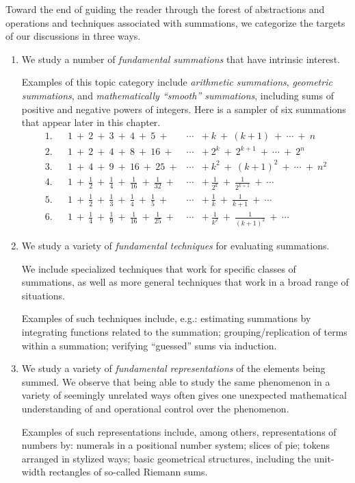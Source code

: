 Toward the end of guiding the reader through the forest of
abstractions and operations and techniques associated with summations,
we categorize the targets of our discussions in three ways.
\begin{enumerate}
\item
We study a number of {\it fundamental summations} that have intrinsic
interest.

\smallskip

Examples of this topic category include {\it arithmetic summations},
{\it geometric summations}, and {\it mathematically ``smooth''
  summations}, including sums of positive and negative powers of
integers.  Here is a sampler of six summations that appear later in this
chapter.
\[
\begin{array}{lclcl}
1.  & &
1 \ + \ 2 \ + \ 3 \ + \ 4 \ + \ 5 \ + & \cdots & + \ k  \ + \ (k+1) \ +
\ \cdots \ + \ n \\
2. & &
1 \ + \ 2 \ + \ 4 \ + \ 8 \ + \ 16 \ + & \cdots & + \ 2^k  \ +
\ 2^{k+1} \ + \ \cdots \ + \ 2^n \\
3. & &
1 \ + \ 4 \ + \ 9 \ + \ 16 \ + \ 25 \ + & \cdots & + \ k^2  \ + \ (k+1)^2 \ +
\ \cdots \ + \ n^2 \\
4. & &
1 \ + \ \frac{1}{2} \ + \ \frac{1}{4} \ + \ \frac{1}{16} \ +
\ \frac{1}{32} \ + & \cdots & + \ \frac{1}{2^k}  \ + \ \frac{1}{2^{k+1}} \ +
\ \cdots \\
5. & &
1 \ + \ \frac{1}{2} \ + \ \frac{1}{3} \ + \ \frac{1}{4} \ +
\ \frac{1}{5} \ + & \cdots & + \ \frac{1}{k}  \ + \ \frac{1}{k+1} \ +
\ \cdots \\
6. & &
1 \ + \ \frac{1}{4} \ + \ \frac{1}{9} \ + \ \frac{1}{16} \ +
\ \frac{1}{25} \ + & \cdots & + \ \frac{1}{k^2}  \ + \ \frac{1}{(k+1)^2} \ +
\ \cdots
\end{array}
\]

\item
We study a variety of {\it fundamental techniques} for evaluating
summations.

\smallskip

We include specialized techniques that work for specific classes of
summations, as well as more general techniques that work in a broad
range of situations.

\smallskip

Examples of such techniques include, e.g.: estimating summations by
integrating functions related to the summation; grouping/replication
of terms within a summation; verifying ``guessed'' sums via induction.

\item
We study a variety of {\it fundamental representations} of the
elements being summed.  We observe that being able to study the same
phenomenon in a variety of seemingly unrelated ways often gives one
unexpected mathematical understanding of and operational control over
the phenomenon.

\smallskip

Examples of such representations include, among others,
representations of numbers by: numerals in a positional number system;
slices of pie; tokens arranged in stylized ways; basic geometrical
structures, including the unit-width rectangles of so-called Riemann sums.
\end{enumerate}

